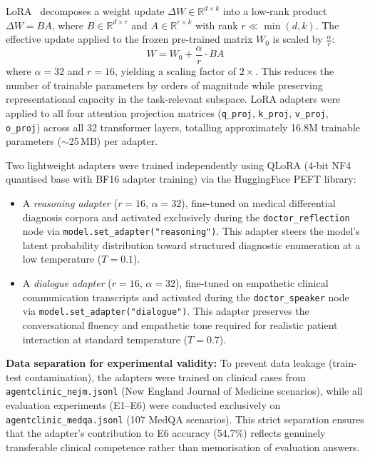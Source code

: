 LoRA~\cite{hu2022lora} decomposes a weight update $\Delta W \in \mathbb{R}^{d \times k}$ into a low-rank product $\Delta W = BA$, where $B \in \mathbb{R}^{d \times r}$ and $A \in \mathbb{R}^{r \times k}$ with rank $r \ll \min(d, k)$. The effective update applied to the frozen pre-trained matrix $W_0$ is scaled by $\frac{\alpha}{r}$:
\begin{equation}
W = W_0 + \frac{\alpha}{r} \cdot BA
\end{equation}
where $\alpha = 32$ and $r = 16$, yielding a scaling factor of $2\times$. This reduces the number of trainable parameters by orders of magnitude while preserving representational capacity in the task-relevant subspace. LoRA adapters were applied to all four attention projection matrices (\texttt{q\_proj}, \texttt{k\_proj}, \texttt{v\_proj}, \texttt{o\_proj}) across all 32 transformer layers, totalling approximately 16.8M trainable parameters ($\sim$25\,MB) per adapter.

Two lightweight adapters were trained independently using QLoRA (4-bit NF4 quantised base with BF16 adapter training) via the HuggingFace PEFT library:
\begin{itemize}
    \item A \textit{reasoning adapter} ($r=16$, $\alpha=32$), fine-tuned on medical differential diagnosis corpora and activated exclusively during the \texttt{doctor\_reflection} node via \texttt{model.set\_adapter("reasoning")}. This adapter steers the model's latent probability distribution toward structured diagnostic enumeration at a low temperature ($T = 0.1$).
    \item A \textit{dialogue adapter} ($r=16$, $\alpha=32$), fine-tuned on empathetic clinical communication transcripts and activated during the \texttt{doctor\_speaker} node via \texttt{model.set\_adapter("dialogue")}. This adapter preserves the conversational fluency and empathetic tone required for realistic patient interaction at standard temperature ($T = 0.7$).
\end{itemize}

\textbf{Data separation for experimental validity:} To prevent data leakage (train-test contamination), the adapters were trained on clinical cases from \texttt{agentclinic\_nejm.jsonl} (New England Journal of Medicine scenarios), while all evaluation experiments (E1--E6) were conducted exclusively on \texttt{agentclinic\_medqa.jsonl} (107 MedQA scenarios). This strict separation ensures that the adapter's contribution to E6 accuracy (54.7\%) reflects genuinely transferable clinical competence rather than memorisation of evaluation answers.

